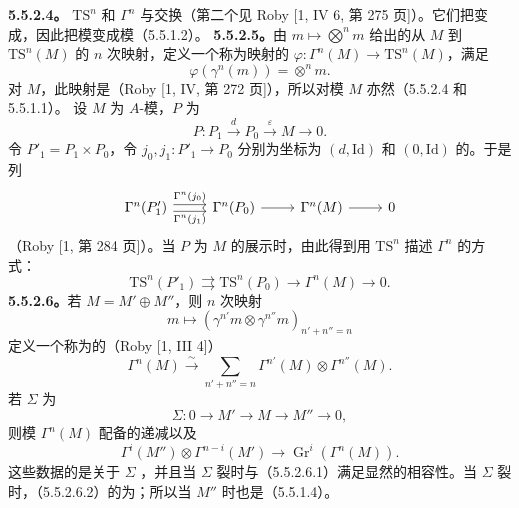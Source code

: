 \textbf{5.5.2.4。} $\mathrm{TS}^n$ 和 $\Gamma^n$ 与交换（第二个见 Roby [1, IV 6, 第 275 页]）。它们把变成，因此把模变成模（5.5.1.2）。
\textbf{5.5.2.5。}由 $m\mapsto\bigotimes^n m$ 给出的从 $M$ 到 $\mathrm{TS}^n(M)$ 的 $n$ 次映射，定义一个称为映射的 $\varphi:\Gamma^n(M)\to\mathrm{TS}^n(M)$，满足
\[\varphi(\gamma^n(m))=\mathop{\otimes}\nolimits^n m.\]
对 $M$，此映射是（Roby [1, IV, 第 272 页]），所以对模 $M$ 亦然（5.5.2.4 和 5.5.1.1）。
设 $M$ 为 $A$-模，$P$ 为
\[P:P_1\xrightarrow d P_0\xrightarrow\varepsilon M\longrightarrow0.\]
令 $P'_1=P_1\times P_0$，令 $j_0,j_1:P'_1\to P_0$ 分别为坐标为 $(d,\mathrm{Id})$ 和 $(0,\mathrm{Id})$ 的。于是列
\[\begin{tikzcd}
\Gamma^n(P'_1)\arrow[r,shift left,"\Gamma^n(j_0)"]\arrow[r,shift right,"\Gamma^n(j_1)"']&\Gamma^n(P_0)\arrow[r]&\Gamma^n(M)\arrow[r]&0
\end{tikzcd}\]
（Roby [1, 第 284 页]）。当 $P$ 为 $M$ 的展示时，由此得到用 $\mathrm{TS}^n$ 描述 $\Gamma^n$ 的方式：
\begin{equation}\tag{5.5.2.5.1}\mathrm{TS}^n(P'_1)\rightrightarrows\mathrm{TS}^n(P_0)\longrightarrow\Gamma^n(M)\longrightarrow0.\end{equation}
\textbf{5.5.2.6。}若 $M=M'\oplus M''$，则 $n$ 次映射
\[m\longmapsto(\gamma^{n'}m\otimes\gamma^{n''}m)_{n'+n''=n}\]
定义一个称为的（Roby [1, III 4]）
\begin{equation}\tag{5.5.2.6.1}\Gamma^n(M)\xrightarrow\sim\sum_{n'+n''=n}\Gamma^{n'}(M)\otimes\Gamma^{n''}(M).\end{equation}
若 $\Sigma$ 为
\[\Sigma:0\longrightarrow M'\longrightarrow M\longrightarrow M''\longrightarrow0,\]
则模 $\Gamma^n(M)$ 配备的递减以及
\begin{equation}\tag{5.5.2.6.2}\Gamma^i(M'')\otimes\Gamma^{n-i}(M')\longrightarrow\operatorname{Gr}^i(\Gamma^n(M)).\end{equation}
这些数据的是关于 $\Sigma$ ，并且当 $\Sigma$ 裂时与（5.5.2.6.1）满足显然的相容性。当 $\Sigma$ 裂时，（5.5.2.6.2）的为；所以当 $M''$ 时也是（5.5.1.4）。

